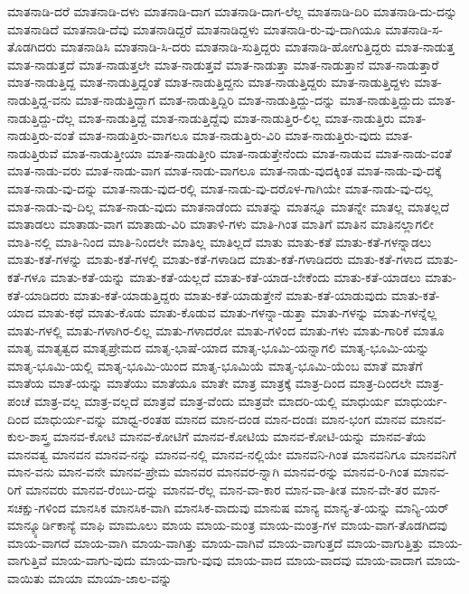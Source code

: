 {ಮಾತನಾಡಿ-ದರೆ
ಮಾತನಾಡಿ-ದಳು
ಮಾತನಾಡಿ-ದಾಗ
ಮಾತನಾಡಿ-ದಾಗ-ಲೆಲ್ಲ
ಮಾತನಾಡಿ-ದಿರಿ
ಮಾತನಾಡಿ-ದು-ದನ್ನು
ಮಾತನಾಡಿದೆ
ಮಾತನಾಡಿ-ದೆವು
ಮಾತನಾಡಿದ್ದರೆ
ಮಾತನಾಡಿದ್ದಳು
ಮಾತನಾಡಿ-ರು-ವು-ದಾಗಿಯೂ
ಮಾತನಾಡಿ-ಸ-ತೊಡಗಿದರು
ಮಾತನಾಡಿಸಿ
ಮಾತನಾಡಿ-ಸಿ-ದರು
ಮಾತನಾಡಿ-ಸುತ್ತಿದ್ದರು
ಮಾತನಾಡಿ-ಹೋಗುತ್ತಿದ್ದರು
ಮಾತ-ನಾಡುತ್ತ
ಮಾತ-ನಾಡುತ್ತದೆ
ಮಾತ-ನಾಡುತ್ತಲೇ
ಮಾತ-ನಾಡುತ್ತವೆ
ಮಾತ-ನಾಡುತ್ತಾ
ಮಾತ-ನಾಡುತ್ತಾನೆ
ಮಾತ-ನಾಡುತ್ತಾರೆ
ಮಾತ-ನಾಡುತ್ತಿದ್ದ
ಮಾತ-ನಾಡುತ್ತಿದ್ದಂತೆ
ಮಾತ-ನಾಡುತ್ತಿದ್ದನು
ಮಾತ-ನಾಡುತ್ತಿದ್ದರು
ಮಾತ-ನಾಡುತ್ತಿದ್ದಳು
ಮಾತ-ನಾಡುತ್ತಿದ್ದ-ವನು
ಮಾತ-ನಾಡುತ್ತಿದ್ದಾಗ
ಮಾತ-ನಾಡುತ್ತಿದ್ದಿರಿ
ಮಾತ-ನಾಡುತ್ತಿದ್ದು-ದನ್ನು
ಮಾತ-ನಾಡುತ್ತಿದ್ದುದು
ಮಾತ-ನಾಡುತ್ತಿದ್ದು-ದೆಲ್ಲ
ಮಾತ-ನಾಡುತ್ತಿದ್ದೆ
ಮಾತ-ನಾಡುತ್ತಿದ್ದೆವು
ಮಾತ-ನಾಡುತ್ತಿರ-ಲಿಲ್ಲ
ಮಾತ-ನಾಡುತ್ತಿರು
ಮಾತ-ನಾಡುತ್ತಿರು-ವಂತೆ
ಮಾತ-ನಾಡುತ್ತಿರು-ವಾಗಲೂ
ಮಾತ-ನಾಡುತ್ತಿರು-ವಿರಿ
ಮಾತ-ನಾಡುತ್ತಿರು-ವುದು
ಮಾತ-ನಾಡುತ್ತಿರುವೆ
ಮಾತ-ನಾಡುತ್ತೀಯಾ
ಮಾತ-ನಾಡುತ್ತೀರಿ
ಮಾತ-ನಾಡುತ್ತೇನೆಂದು
ಮಾತ-ನಾಡುವ
ಮಾತ-ನಾಡು-ವಂತೆ
ಮಾತ-ನಾಡು-ವರು
ಮಾತ-ನಾಡು-ವಾಗ
ಮಾತ-ನಾಡು-ವಾಗಲೂ
ಮಾತ-ನಾಡು-ವುದಕ್ಕಿಂತ
ಮಾತ-ನಾಡು-ವು-ದಕ್ಕೆ
ಮಾತ-ನಾಡು-ವು-ದನ್ನು
ಮಾತ-ನಾಡು-ವುದ-ರಲ್ಲಿ
ಮಾತ-ನಾಡು-ವು-ದರೊಳ-ಗಾಗಿಯೇ
ಮಾತ-ನಾಡು-ವು-ದಲ್ಲ
ಮಾತ-ನಾಡು-ವು-ದಿಲ್ಲ
ಮಾತ-ನಾಡು-ವುದು
ಮಾತನಾಡೆಂದು
ಮಾತನ್ನು
ಮಾತನ್ನೂ
ಮಾತನ್ನೇ
ಮಾತಲ್ಲ
ಮಾತಲ್ಲದೆ
ಮಾತಾಡಲು
ಮಾತಾಡು-ವಾಗ
ಮಾತಾಡು-ವಿರಿ
ಮಾತಾಳಿ-ಗಳು
ಮಾತಿ-ಗಿಂತ
ಮಾತಿಗೆ
ಮಾತಿನ
ಮಾತಿನಲ್ಲಾಗಲೀ
ಮಾತಿ-ನಲ್ಲಿ
ಮಾತಿ-ನಿಂದ
ಮಾತಿ-ನಿಂದಲೇ
ಮಾತಿಲ್ಲ
ಮಾತಿಲ್ಲದೆ
ಮಾತು
ಮಾತು-ಕತೆ
ಮಾತು-ಕತೆ-ಗಳನ್ನಾಡಲು
ಮಾತು-ಕತೆ-ಗಳನ್ನು
ಮಾತು-ಕತೆ-ಗಳಲ್ಲಿ
ಮಾತು-ಕತೆ-ಗಳಾಡಿದ
ಮಾತು-ಕತೆ-ಗಳಾಡಿದರು
ಮಾತು-ಕತೆ-ಗಳಾದ
ಮಾತು-ಕತೆ-ಗಳೂ
ಮಾತು-ಕತೆ-ಯನ್ನು
ಮಾತು-ಕತೆ-ಯಲ್ಲದೆ
ಮಾತು-ಕತೆ-ಯಾಡ-ಬೇಕೆಂದು
ಮಾತು-ಕತೆ-ಯಾಡಲು
ಮಾತು-ಕತೆ-ಯಾಡಿದರು
ಮಾತು-ಕತೆ-ಯಾಡುತ್ತಿದ್ದರು
ಮಾತು-ಕತೆ-ಯಾಡುತ್ತೇನೆ
ಮಾತು-ಕತೆ-ಯಾಡುವುದು
ಮಾತು-ಕತೆ-ಯಾದ
ಮಾತು-ಕಥೆ
ಮಾತು-ಕೊಡು
ಮಾತು-ಕೊಡುವ
ಮಾತು-ಗಳನ್ನಾ-ಡುತ್ತಾ
ಮಾತು-ಗಳನ್ನು
ಮಾತು-ಗಳನ್ನೆಲ್ಲ
ಮಾತು-ಗಳಲ್ಲಿ
ಮಾತು-ಗಳಾಗಿರ-ಲಿಲ್ಲ
ಮಾತು-ಗಳಾದರೋ
ಮಾತು-ಗಳಿಂದ
ಮಾತು-ಗಳು
ಮಾತು-ಗಾರಿಕೆ
ಮಾತೂ
ಮಾತೃ
ಮಾತೃತ್ವದ
ಮಾತೃಪ್ರೇಮದ
ಮಾತೃ-ಭಾಷೆ-ಯಾದ
ಮಾತೃ-ಭೂಮಿ-ಯನ್ನಾಗಲಿ
ಮಾತೃ-ಭೂಮಿ-ಯನ್ನು
ಮಾತೃ-ಭೂಮಿ-ಯಲ್ಲಿ
ಮಾತೃ-ಭೂಮಿ-ಯಿಂದ
ಮಾತೃ-ಭೂಮಿಯೆ
ಮಾತೃ-ಭೂಮಿ-ಯೆಂಬ
ಮಾತೆ
ಮಾತೆಗೆ
ಮಾತೆಯ
ಮಾತೆ-ಯನ್ನು
ಮಾತೆಯು
ಮಾತೆಯೂ
ಮಾತೇ
ಮಾತ್ರ
ಮಾತ್ರಕ್ಕೆ
ಮಾತ್ರ-ದಿಂದ
ಮಾತ್ರ-ದಿಂದಲೇ
ಮಾತ್ರ-ಪಂಚೆ
ಮಾತ್ರ-ವಲ್ಲ
ಮಾತ್ರ-ವಲ್ಲದೆ
ಮಾತ್ರವೆ
ಮಾತ್ರ-ವೆಂದು
ಮಾತ್ರವೇ
ಮಾದರಿ-ಯಲ್ಲಿ
ಮಾಧುರ್ಯ
ಮಾಧುರ್ಯ-ದಿಂದ
ಮಾಧುರ್ಯ-ವನ್ನು
ಮಾಧ್ವ-ರಂತಹ
ಮಾನದ
ಮಾನ-ದಂಡ
ಮಾನ-ದಂಡಃ
ಮಾನ-ಭಂಗ
ಮಾನವ
ಮಾನವ-ಕುಲ-ಶಾಸ್ತ್ರ
ಮಾನವ-ಕೋಟಿ
ಮಾನವ-ಕೋಟಿಗೆ
ಮಾನವ-ಕೋಟಿಯ
ಮಾನವ-ಕೋಟಿ-ಯನ್ನು
ಮಾನವ-ತೆಯ
ಮಾನವತ್ವ
ಮಾನವನ
ಮಾನವ-ನನ್ನು
ಮಾನವ-ನಲ್ಲಿ
ಮಾನವ-ನಲ್ಲಿಯೇ
ಮಾನವನಿ-ಗಿಂತ
ಮಾನವನಿಗೂ
ಮಾನವನಿಗೆ
ಮಾನ-ವನು
ಮಾನ-ವನೇ
ಮಾನವ-ಪ್ರೇಮ
ಮಾನವರ
ಮಾನವರ-ನ್ನಾಗಿ
ಮಾನವ-ರನ್ನು
ಮಾನವ-ರಿ-ಗಿಂತ
ಮಾನವ-ರಿಗೆ
ಮಾನವರು
ಮಾನವ-ರೆಂಬು-ದನ್ನು
ಮಾನವ-ರೆಲ್ಲ
ಮಾನ-ವಾ-ಕಾರ
ಮಾನ-ವಾ-ತೀತ
ಮಾನ-ವೇ-ತರ
ಮಾನ-ಸಚಕ್ಷು-ಗಳಿಂದ
ಮಾನಸಿಕ
ಮಾನಸಿಕ-ವಾಗಿ
ಮಾನಸಿಕ-ವಾದುವು
ಮಾನುಷ
ಮಾನ್ಯ
ಮಾನ್ಯ-ತೆ-ಯನ್ನು
ಮಾನ್ಯಿ-ಯರ್
ಮಾನ್ಕ್ಯೂರ್ಡಿಕಾನ್ಯೆ
ಮಾಫಿ
ಮಾಮೂಲು
ಮಾಯ
ಮಾಯ-ಮಂತ್ರ
ಮಾಯ-ಮಂತ್ರ-ಗಳ
ಮಾಯ-ವಾಗ-ತೊಡಗಿದವು
ಮಾಯ-ವಾಗದೆ
ಮಾಯ-ವಾಗಿ
ಮಾಯ-ವಾಗಿತ್ತು
ಮಾಯ-ವಾಗಿವೆ
ಮಾಯ-ವಾಗುತ್ತದೆ
ಮಾಯ-ವಾಗುತ್ತಿತ್ತು
ಮಾಯ-ವಾಗುತ್ತಿವೆ
ಮಾಯ-ವಾಗು-ವುದು
ಮಾಯ-ವಾಗು-ವುವು
ಮಾಯ-ವಾದ
ಮಾಯ-ವಾದವು
ಮಾಯ-ವಾದಾಗ
ಮಾಯ-ವಾಯಿತು
ಮಾಯಾ
ಮಾಯಾ-ಜಾಲ-ವನ್ನು
}
